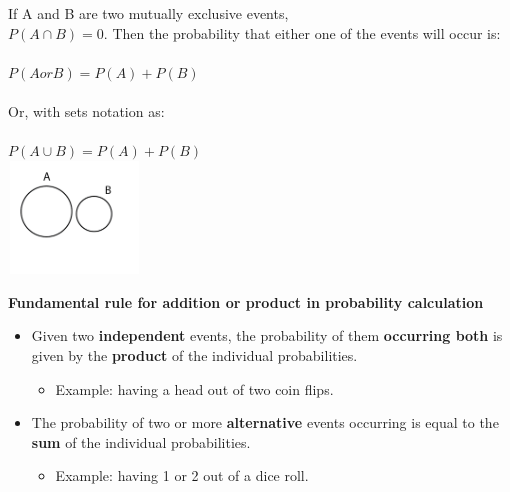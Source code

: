 \documentclass{article}
\begin{document}
If A and B are two mutually exclusive events, \\ 
$P(A \cap B) = 0$. Then the probability that either one of the events will occur is: \\
\mbox{} \\
$P(A or B)=P(A)+P(B)$ \\
\mbox{} \\
Or, with sets notation as: \\ 
\mbox{} \\
$P(A \cup B)=P(A) + P(B)$ \\ 

\includegraphics[width=3.5cm, height=3cm]{independent}

\textbf{Fundamental rule for addition or product in probability calculation} \\

\begin{itemize}
    \item Given two \textbf{independent} events, the probability of them \textbf{occurring both} is given by the \textbf{product} of the individual probabilities. 
    \begin{itemize}
        \item Example: having a head out of two coin flips.
    \end{itemize}
    \item The probability of two or more \textbf{alternative} events occurring is equal to the \textbf{sum} of the individual probabilities. 
    \begin{itemize}
        \item Example: having 1 or 2 out of a dice roll.
    \end{itemize}
\end{itemize}
\end{document}
